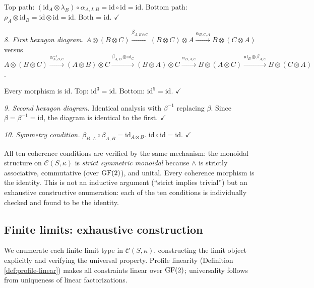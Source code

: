 Top path: $(\mathrm{id}_A \otimes \lambda_B) \circ
\alpha_{A,I,B} = \mathrm{id} \circ \mathrm{id}
= \mathrm{id}$.
Bottom path: $\rho_A \otimes \mathrm{id}_B = \mathrm{id}
\otimes \mathrm{id} = \mathrm{id}$.
Both = id. $\checkmark$

\emph{8. First hexagon diagram.}
$A \otimes (B \otimes C)
\xrightarrow{\beta_{A, B \otimes C}}
(B \otimes C) \otimes A
\xrightarrow{\alpha_{B,C,A}}
B \otimes (C \otimes A)$
versus
$A \otimes (B \otimes C)
\xrightarrow{\alpha_{A,B,C}^{-1}}
(A \otimes B) \otimes C
\xrightarrow{\beta_{A,B} \otimes \mathrm{id}_C}
(B \otimes A) \otimes C
\xrightarrow{\alpha_{B,A,C}}
B \otimes (A \otimes C)
\xrightarrow{\mathrm{id}_B \otimes \beta_{A,C}}
B \otimes (C \otimes A)$.

Every morphism is id. Top: $\mathrm{id}^3 = \mathrm{id}$.
Bottom: $\mathrm{id}^5 = \mathrm{id}$. $\checkmark$

\emph{9. Second hexagon diagram.}
Identical analysis with $\beta^{-1}$ replacing $\beta$.
Since $\beta = \beta^{-1} = \mathrm{id}$, the diagram
is identical to the first. $\checkmark$

\emph{10. Symmetry condition.}
$\beta_{B,A} \circ \beta_{A,B} = \mathrm{id}_{A \otimes B}$.
$\mathrm{id} \circ \mathrm{id} = \mathrm{id}$. $\checkmark$

\medskip
All ten coherence conditions are verified by the same
mechanism: the monoidal structure on
$\mathcal{C}(S,\kappa)$ is \emph{strict symmetric
monoidal} because $\wedge$ is strictly associative,
commutative (over $\operatorname{GF}(2)$), and unital. Every coherence
morphism is the identity. This is not an inductive
argument (``strict implies trivial'') but an exhaustive
constructive enumeration: each of the ten conditions is
individually checked and found to be the identity.


\subsection{Finite limits: exhaustive construction}
\label{app:limits-exhaustive}

We enumerate each finite limit type in
$\mathcal{C}(S,\kappa)$, constructing the limit object
explicitly and verifying the universal property.
Profile linearity (Definition \ref{def:profile-linear})
makes all constraints linear over $\operatorname{GF}(2)$; universality
follows from uniqueness of linear factorizations.

